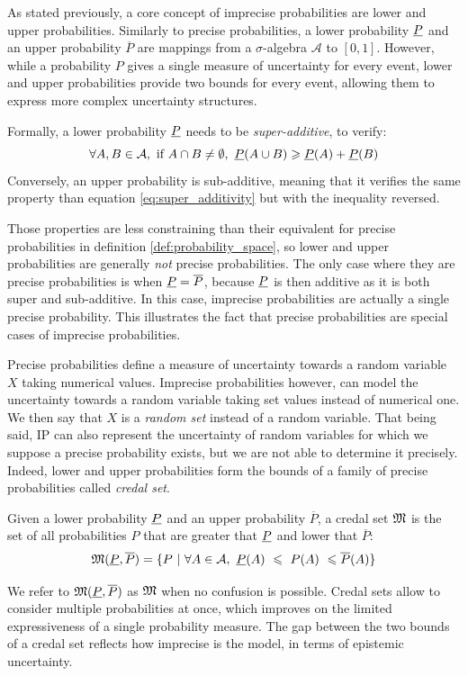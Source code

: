 As stated previously, a core concept of imprecise probabilities are lower and upper probabilities. Similarly to precise probabilities, a lower probability ${\underline{P}}$ and an upper probability $\overline{P}$ are mappings from a $\sigma$-algebra $\mathcal{A}$ to $[0, 1]$. However, while a probability $P$ gives a single measure of uncertainty for every event, lower and upper probabilities provide two bounds for every event, allowing them to express more complex uncertainty structures.

\begin{remark}
    Formally, a lower probability ${\underline{P}}$ needs to be \textit{super-additive}, \ie to verify:
    \begin{equation}
        \forall A,B\in\mathcal{A}, \text{ if } A\cap B\neq\emptyset, ~{\underline{P}}(A\cup B)\geqslant {\underline{P}}(A)+{\underline{P}}(B) \label{eq:super_additivity}
    \end{equation}
    Conversely, an upper probability is sub-additive, meaning that it verifies the same property than equation \eqref{eq:super_additivity} but with the inequality reversed.
    
    Those properties are less constraining than their equivalent for precise probabilities in definition \ref{def:probability_space}, so lower and upper probabilities are generally \textit{not} precise probabilities. The only case where they are precise probabilities is when ${\underline{P}}=\overline{P}$, because ${\underline{P}}$ is then additive as it is both super and sub-additive. In this case, imprecise probabilities are actually a single precise probability. This illustrates the fact that precise probabilities are special cases of imprecise probabilities. 
\end{remark}

Precise probabilities define a measure of uncertainty towards a random variable $X$ taking numerical values. Imprecise probabilities however, can model the uncertainty towards a random variable taking set values instead of numerical one. We then say that $X$ is a \textit{random set} instead of a random variable. That being said, IP can also represent the uncertainty of random variables for which we suppose a precise probability exists, but we are not able to determine it precisely. Indeed, lower and upper probabilities form the bounds of a family of precise probabilities called \textit{credal set}.
\begin{definition}\label{def:credal_set}
    Given a lower probability ${\underline{P}}$ and an upper probability $\overline{P}$, a credal set ${\mathfrak{M}}$ is the set of all probabilities $P$ that are greater that ${\underline{P}}$ and lower that $\overline{P}$:
    \begin{equation}
        {\mathfrak{M}}({\underline{P}}, \overline{P}) = \{P~|~\forall A\in\mathcal{A},~{\underline{P}}(A)~\leqslant~P(A)~\leqslant\overline{P}(A)\}
    \end{equation}
\end{definition}
We refer to ${\mathfrak{M}}({\underline{P}}, \overline{P})$ as ${\mathfrak{M}}$ when no confusion is possible. Credal sets allow to consider multiple probabilities at once, which improves on the limited expressiveness of a single probability measure. The gap between the two bounds of a credal set reflects how imprecise is the model, in terms of epistemic uncertainty.

